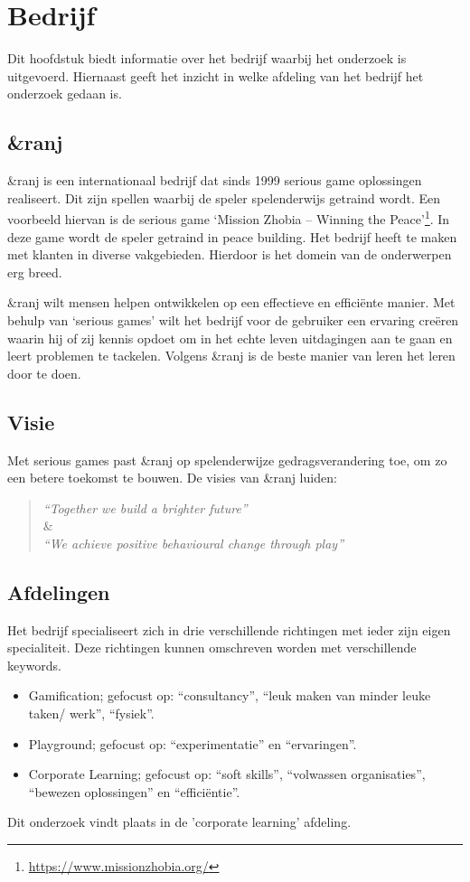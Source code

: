 \chapter{Bedrijf}
\label{ch:bedrijf}
Dit hoofdstuk biedt informatie over het bedrijf waarbij het onderzoek is uitgevoerd. Hiernaast geeft het inzicht in welke afdeling van het bedrijf het onderzoek gedaan is. 

\section{\&ranj}
\&ranj is een internationaal bedrijf dat sinds 1999 serious game oplossingen realiseert. Dit zijn spellen waarbij de speler spelenderwijs getraind wordt. Een voorbeeld hiervan is de serious game ‘Mission Zhobia – Winning the Peace’\footnote{\url{https://www.missionzhobia.org/}}. In deze game wordt de speler getraind in peace building. Het bedrijf heeft te maken met klanten in diverse vakgebieden. Hierdoor is het domein van de onderwerpen erg breed.

\&ranj wilt mensen helpen ontwikkelen op een effectieve en efficiënte manier. Met behulp van ‘serious games’ wilt het bedrijf voor de gebruiker een ervaring creëren waarin hij of zij kennis opdoet om in het echte leven uitdagingen aan te gaan en leert problemen te tackelen. Volgens \&ranj is de beste manier van leren het leren door te doen.

\section{Visie}
Met serious games past \&ranj op spelenderwijze gedragsverandering toe, om zo een betere toekomst te bouwen. De visies van \&ranj luiden:

\begin{quote} 
    \centering
    \large
    \textit{
        “Together we build a brighter future”
    }\\
    \&\\
    \textit{
        “We achieve positive behavioural change through play”
    }
\end{quote}

\section{Afdelingen}
Het bedrijf specialiseert zich in drie verschillende richtingen met ieder zijn eigen specialiteit. Deze richtingen kunnen omschreven worden met verschillende keywords.
\begin{itemize}
    \item Gamification; gefocust op: “consultancy”, “leuk maken van minder leuke taken/ werk”, “fysiek”.
    \item Playground; gefocust op: “experimentatie” en “ervaringen”.
    \item Corporate Learning; gefocust op: “soft skills”, “volwassen organisaties”, “bewezen oplossingen” en “efficiëntie”.
\end{itemize}
Dit onderzoek vindt plaats in de 'corporate learning’ afdeling.

